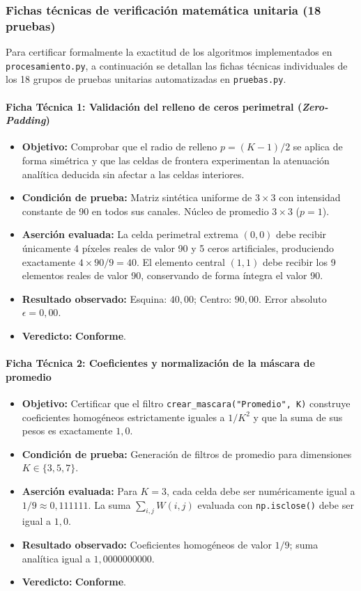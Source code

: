 \documentclass[11pt]{article}
\newcommand{\pruebaok}{\textcolor{verdeExito}{\textbf{Conforme}}}
\begin{document}
\subsubsection{Fichas técnicas de verificación matemática unitaria (18 pruebas)}

Para certificar formalmente la exactitud de los algoritmos implementados en \texttt{procesamiento.py}, a continuación se detallan las fichas técnicas individuales de los 18 grupos de pruebas unitarias automatizadas en \texttt{pruebas.py}.

\paragraph{Ficha Técnica 1: Validación del relleno de ceros perimetral (\textit{Zero-Padding})}
\begin{itemize}[itemsep=0.15em]
\item \textbf{Objetivo:} Comprobar que el radio de relleno $p=(K-1)/2$ se aplica de forma simétrica y que las celdas de frontera experimentan la atenuación analítica deducida sin afectar a las celdas interiores.
\item \textbf{Condición de prueba:} Matriz sintética uniforme de $3\times3$ con intensidad constante de 90 en todos sus canales. Núcleo de promedio $3\times3$ ($p=1$).
\item \textbf{Aserción evaluada:} La celda perimetral extrema $(0, 0)$ debe recibir únicamente 4 píxeles reales de valor 90 y 5 ceros artificiales, produciendo exactamente $4 \times 90 / 9 = 40$. El elemento central $(1, 1)$ debe recibir los 9 elementos reales de valor 90, conservando de forma íntegra el valor 90.
\item \textbf{Resultado observado:} Esquina: $40,00$; Centro: $90,00$. Error absoluto $\epsilon = 0,00$.
\item \textbf{Veredicto:} \pruebaok.
\end{itemize}

\paragraph{Ficha Técnica 2: Coeficientes y normalización de la máscara de promedio}
\begin{itemize}[itemsep=0.15em]
\item \textbf{Objetivo:} Certificar que el filtro \texttt{crear\_mascara("Promedio", K)} construye coeficientes homogéneos estrictamente iguales a $1/K^2$ y que la suma de sus pesos es exactamente $1,0$.
\item \textbf{Condición de prueba:} Generación de filtros de promedio para dimensiones $K \in \{3, 5, 7\}$.
\item \textbf{Aserción evaluada:} Para $K=3$, cada celda debe ser numéricamente igual a $1/9 \approx 0,111111$. La suma $\sum_{i, j} W(i, j)$ evaluada con \texttt{np.isclose()} debe ser igual a $1,0$.
\item \textbf{Resultado observado:} Coeficientes homogéneos de valor $1/9$; suma analítica igual a $1,0000000000$.
\item \textbf{Veredicto:} \pruebaok.
\end{itemize}
\end{document}
